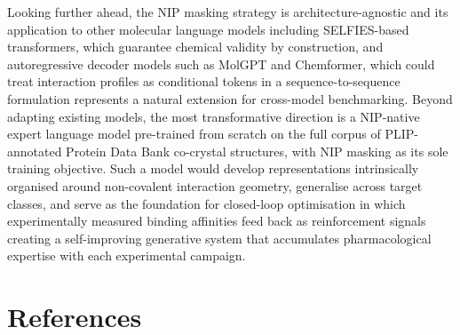 \documentclass[a4paper,12pt]{article}
\begin{document}
Looking further ahead, the NIP masking strategy is
architecture-agnostic and its application to other molecular
language models including SELFIES-based transformers, which
guarantee chemical validity by construction, and
autoregressive decoder models such as MolGPT and Chemformer,
which could treat interaction profiles as conditional tokens in
a sequence-to-sequence formulation represents a natural
extension for cross-model benchmarking.
Beyond adapting existing models, the most transformative
direction is a NIP-native expert language model pre-trained from
scratch on the full corpus of PLIP-annotated Protein Data Bank
co-crystal structures, with NIP masking as its sole training
objective.
Such a model would develop representations intrinsically organised
around non-covalent interaction geometry, generalise across target
classes, and serve as the foundation for closed-loop optimisation
in which experimentally measured binding affinities feed back as
reinforcement signals creating a self-improving generative system
that accumulates pharmacological expertise with each experimental
campaign.

















\newpage \section{References}
\vspace{-2em}

\renewcommand{\refname}{}

\end{document}

